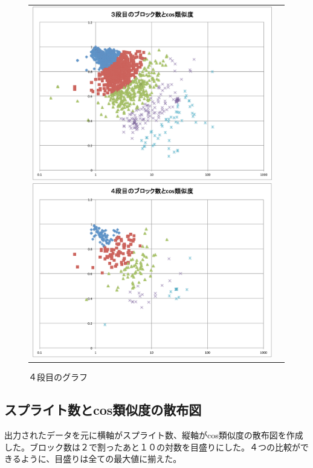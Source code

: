 \documentclass[a4paper,10pt,onecolumn,oneside,openany]{jsbook}
\begin{document}
\begin{figure}[h]
\begin{tabular}{cc}
\begin{minipage}[t]{0.45\hsize}
	 \centering
	 \includegraphics[keepaspectratio, scale = 0.25]{graph_3_block.pdf}
	 \caption{３段目のグラフ}
	 \label{third_block_cos}
	\end{minipage}
        \begin{minipage}[t]{0.45\hsize}
	 \centering
	 \includegraphics[keepaspectratio, scale = 0.25]{graph_4_block.pdf}
	 \caption{４段目のグラフ}
	 \label{fourth_block_cos}
	\end{minipage}
 \end{tabular}
 \end{figure}

\newpage
\subsection{スプライト数とcos類似度の散布図}
 出力されたデータを元に横軸がスプライト数、縦軸がcos類似度の散布図を作成した。ブロック数は２で割ったあと１０の対数を目盛りにした。４つの比較ができるように、目盛りは全ての最大値に揃えた。
\end{document}
